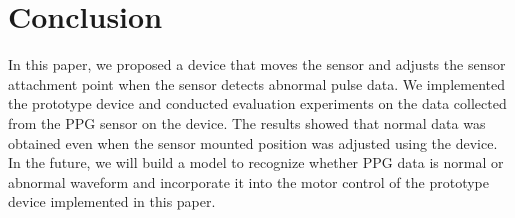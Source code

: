 \documentclass[sigconf, anonymous]{acmart}
\begin{document}



\section{Conclusion}
\label{sec:conclution}
In this paper, we proposed a device that moves the sensor and adjusts the sensor attachment point when the sensor detects abnormal pulse data. We implemented the prototype device and conducted evaluation experiments on the data collected from the PPG sensor on the device.
The results showed that normal data was obtained even when the sensor mounted position was adjusted using the device. In the future, we will build a model to recognize whether PPG data is normal or abnormal waveform and incorporate it into the motor control of the prototype device implemented in this paper.

\end{document}
